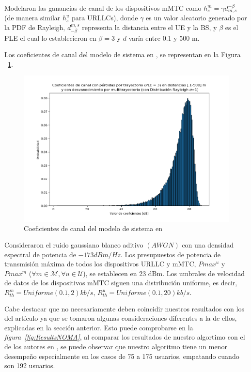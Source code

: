 Modelaron las ganancias de canal de los dispositivos mMTC como $h_{s}^{m} = \gamma d^{ -\beta}_{ m, s}$ (de manera similar $h_{s}^{u}$ para URLLCs), donde $\gamma$ es un valor aleatorio generado por la PDF de Rayleigh, $d_{-\beta}^{m,s}$ representa la distancia entre el UE y la BS, y $\beta$ es el PLE el cual lo establecieron en $\beta = 3$ y $d$ varía entre 0.1 y 500 m. \newline

Los coeficientes de canal del modelo de sistema en \parencite{Shahini2019}, se representan en la Figura ~\ref{fig:CoeficientesCanalShahini}.

\begin{figure}[th]
    \centering
    \includegraphics[scale=.55]{Figures/CoeficientesCanalShahini}
    \decoRule
    \caption[Coeficientes de canal del modelo de sistema en \parencite{Shahini2019}]{Coeficientes de canal del modelo de sistema en \parencite{Shahini2019} }
    \label{fig:CoeficientesCanalShahini}
\end{figure}

Consideraron el ruido gaussiano blanco aditivo $(AWGN)$ con una densidad espectral de potencia de $-173 dBm / Hz$. Los presupuestos de potencia de transmisión máxima de todos los dispositivos URLLC y mMTC, $Pmax ^{u}$ y $Pmax ^{m}$ ($\forall m \in \mathcal {M} , \forall u \in \mathcal {U}$), se establecen en 23 dBm. Los umbrales de velocidad de datos de los dispositivos mMTC siguen una distribución uniforme, es decir, $R_{th}^{ m} = Uniforme (0.1, 2) kb / s$, $R_{th}^{u} = Uniforme (0.1, 20) kb / s$.\newline

Cabe destacar que no necesariamente deben coincidir nuestros resultados con los del artículo ya que se tomaron algunas consideraciones diferentes a la de ellos, explicadas en la sección anterior. Esto puede comprobarse en la \textit{figura~\ref{fig:ResultsNOMA}}, al comparar los resultados de nuestro algortimo con el de los autores en \parencite{Shahini2019}, se puede observar que nuestro algoritmo tiene un menor desempeño especialmente en los casos de 75 a 175 usuarios, empatando cuando son 192 usuarios.\newline

